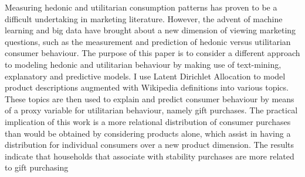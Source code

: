 
Measuring hedonic and utilitarian consumption patterns has proven to be a difficult undertaking in marketing literature. However, the advent of machine learning and big data have brought about a new dimension of viewing marketing questions, such as the measurement and prediction of hedonic versus utilitarian consumer behaviour. The purpose of this paper is to consider a different approach to modeling hedonic and utilitarian behaviour by making use of text-mining, explanatory and predictive models. I use Latent Dirichlet Allocation to model product descriptions augmented with Wikipedia definitions into various topics. These topics are then used to explain and predict consumer behaviour by means of a proxy variable for utilitarian behaviour, namely gift purchases. The practical implication of this work is a more relational distribution of consumer purchases than would be obtained by considering products alone, which assist in having a distribution for individual consumers over a new product dimension. The results indicate that households that associate with stability purchases are more related to gift purchasing 





